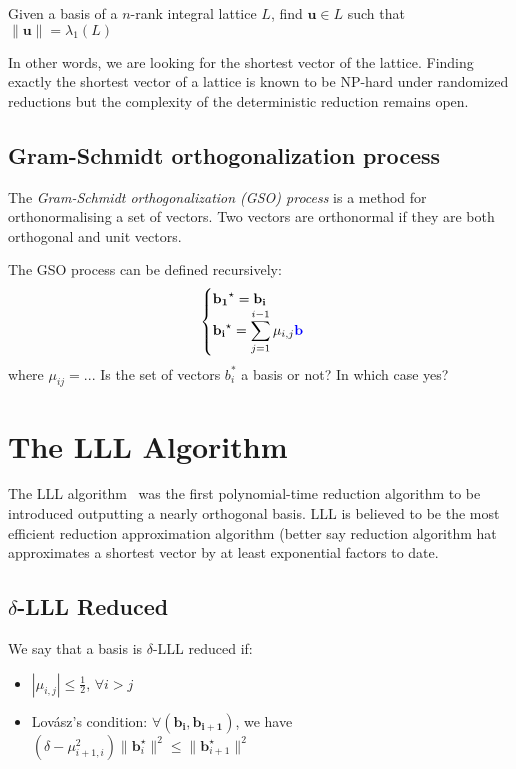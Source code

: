 \documentclass[10pt, a4paper]{article}
\newcommand{\my}[1]{{\color{blue} #1 }}
\renewcommand{\vec}[1]{\mathbf{#1}}
\begin{document}
Given a basis of a $n$-rank integral lattice $L$, find $\vec{u} \in L$ such that $\|\vec{u}\| = \lambda_1 (L)$

In other words, we are looking for \my{the} shortest vector of the lattice. Finding exactly \my{the} shortest vector of a lattice is known to be NP-hard under randomized reductions\cite{Ajtai:1998:SVP} but the complexity of the deterministic reduction remains open.

\subsection{Gram-Schmidt orthogonalization process}
The \emph{Gram-Schmidt orthogonalization (\emph GSO) process} is a method for orthonormalising a set of vectors. Two vectors are orthonormal if they are both orthogonal and unit vectors. 

The GSO process  can be defined recursively:
\[
\begin{cases}
\vec{b_1}^{\star} = \vec{b_i}  \\
\vec{b_i}^{\star} = \displaystyle\sum^{i-1}_{j=1} \mu_{i,j} \my{\vec{b}}
\end{cases}
\]
\my{where $\mu_{ij} = ..$. Is the set of vectors $b_i^*$ a basis or not? In which case yes?}
\section{The LLL Algorithm}

The LLL algorithm~\cite{lllpaper} was the first polynomial-time reduction algorithm to be introduced outputting a nearly orthogonal basis. LLL is believed to be the most efficient \my{reduction approximation algorithm (better say reduction algorithm hat approximates a shortest vector by at least exponential factors} to date\cite{lllAlgorithm}.

\subsection{$\delta$-LLL Reduced}
We say that a basis is $\delta$-LLL reduced if:
\begin{itemize}
\item $| \mu_{i,j}| \leq \frac{1}{2} \text{, } \forall i > j$
\item Lovász's condition: $\forall (\vec{b_i, b_{i+1}})$, we have $(\delta - \mu^2_{i+1,i}) \|\vec{b}^{\star}_{i}\|^2 \leq \| \vec{b}^{\star}_{i+1} \|^2$
\end{itemize}
\end{document}
